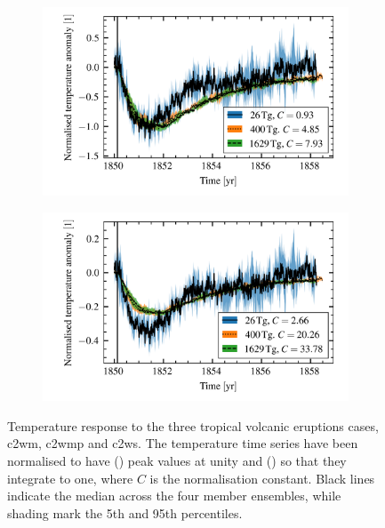 \documentclass{ametsocV5}
\begin{document}

\begin{figure}
  \begin{subfigure}{\linewidth}
    \centering
    \includegraphics[width=0.95\linewidth]{figures/compare-waveform-max}
    \caption{}%
    \label{fig:compare-waveform-max}
  \end{subfigure}
  \begin{subfigure}{\linewidth}
    \centering
    \includegraphics[width=0.95\linewidth]{figures/compare-waveform-integrate}
    \caption{}%
    \label{fig:compare-waveform-integrate}
  \end{subfigure}

  \caption{Temperature response to the three tropical volcanic eruptions cases, \ac{c2wm},
    \ac{c2wmp} and \ac{c2ws}. The temperature time series have been normalised to have
    () peak values at unity and
    () so that they integrate to one, where \(C\) is
    the normalisation constant. Black lines indicate the median across the four member
    ensembles, while shading mark the 5th and 95th percentiles.}\label{fig:compare-waveform}%
\end{figure}
\end{document}

